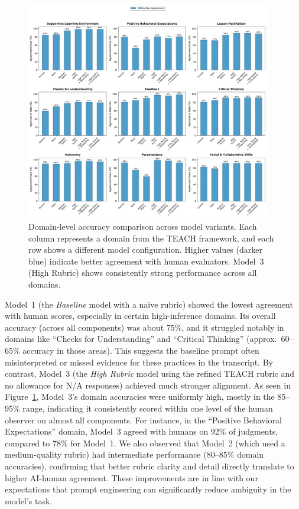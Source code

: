 \documentclass[12pt]{article}
\begin{document}
\begin{figure}[t]\centering
\includegraphics[width=0.95\textwidth]{domain_accuracy_analysis.png}
\caption{Domain-level accuracy comparison across model variants. Each column represents a domain from the TEACH framework, and each row shows a different model configuration. Higher values (darker blue) indicate better agreement with human evaluators. Model~3 (High Rubric) shows consistently strong performance across all domains.}
\label{fig:domain-accuracy}
\end{figure} Model~1 (the \textit{Baseline} model with a naive rubric) showed the lowest agreement with human scores, especially in certain high-inference domains. Its overall accuracy (across all components) was about 75\%, and it struggled notably in domains like “Checks for Understanding” and “Critical Thinking” (approx.\ 60–65\% accuracy in those areas). This suggests the baseline prompt often misinterpreted or missed evidence for these practices in the transcript. By contrast, Model~3 (the \textit{High Rubric} model using the refined TEACH rubric and no allowance for N/A responses) achieved much stronger alignment. As seen in Figure~\ref{fig:domain-accuracy}, Model~3’s domain accuracies were uniformly high, mostly in the 85–95\% range, indicating it consistently scored within one level of the human observer on almost all components. For instance, in the “Positive Behavioral Expectations” domain, Model~3 agreed with humans on 92\% of judgments, compared to 78\% for Model~1. We also observed that Model~2 (which used a medium-quality rubric) had intermediate performance (80–85\% domain accuracies), confirming that better rubric clarity and detail directly translate to higher AI-human agreement. These improvements are in line with our expectations that prompt engineering can significantly reduce ambiguity in the model’s task.
\end{document}

